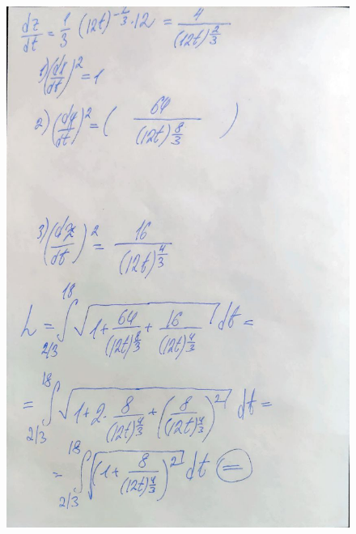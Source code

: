 \documentclass[a4paper,12pt]{article}
\begin{document}
\begin{figure}[H]
    \centering
    \includegraphics[width=0.9\linewidth]{../img/5_2.jpg}
    \label{fig:integral}
\end{figure}
\end{document}

